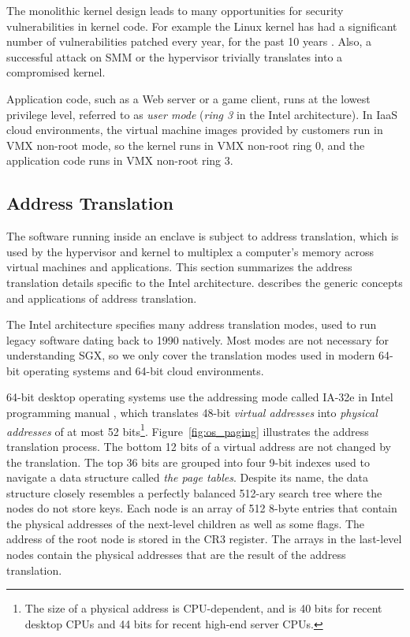 The monolithic kernel design leads to many opportunities for security
vulnerabilities in kernel code. For example the Linux kernel has had a
significant number of vulnerabilities patched every year, for the past 10 years
\cite{cvedetails2014linux} \cite{chen2011linux}. Also, a successful attack on
SMM or the hypervisor trivially translates into a compromised kernel.

Application code, such as a Web server or a game client, runs at the lowest
privilege level, referred to as \textit{user mode} (\textit{ring 3} in the
Intel architecture). In IaaS cloud environments, the virtual machine images
provided by customers run in VMX non-root mode, so the kernel runs in VMX
non-root ring 0, and the application code runs in VMX non-root ring 3.


\subsection{Address Translation}
\label{sec:paging}

The software running inside an enclave is subject to address translation, which
is used by the hypervisor and kernel to multiplex a computer's memory across
virtual machines and applications. This section summarizes the address
translation details specific to the Intel architecture. \cite{jacob1998virtual}
describes the generic concepts and applications of address translation.

The Intel architecture specifies many address translation modes, used to run
legacy software dating back to 1990 natively. Most modes are not necessary for
understanding SGX, so we only cover the translation modes used in modern 64-bit
operating systems and 64-bit cloud environments.

64-bit desktop operating systems use the addressing mode called IA-32e in
Intel programming manual \cite{intel2013manual}, which translates 48-bit
\textit{virtual addresses} into \textit{physical addresses} of at most 52
bits\footnote{The size of a physical address is CPU-dependent, and is 40 bits
for recent desktop CPUs and 44 bits for recent high-end server CPUs.}.
Figure~\ref{fig:os_paging} illustrates the address translation process. The
bottom 12 bits of a virtual address are not changed by the translation. The top
36 bits are grouped into four 9-bit indexes used to navigate a data structure
called \textit{the page tables}. Despite its name, the data structure closely
resembles a perfectly balanced 512-ary search tree where the nodes do not store
keys. Each node is an array of 512 8-byte entries that contain the physical
addresses of the next-level children as well as some flags. The address of the
root node is stored in the CR3 register. The arrays in the last-level nodes
contain the physical addresses that are the result of the address translation.

